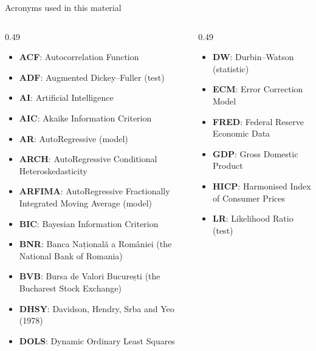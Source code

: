 {
\begin{frame}[noframenumbering]
    \titlepage
\end{frame}
}
\begin{frame}{Acronyms used in this material}
\begin{columns}[T]
\begin{column}{0.49\textwidth}
\begin{itemize}\setlength{\itemsep}{0pt}
    \item \textbf{ACF}: Autocorrelation Function
    \item \textbf{ADF}: Augmented Dickey–Fuller (test)
    \item \textbf{AI}: Artificial Intelligence
    \item \textbf{AIC}: Akaike Information Criterion
    \item \textbf{AR}: AutoRegressive (model)
    \item \textbf{ARCH}: AutoRegressive Conditional Heteroskedasticity
    \item \textbf{ARFIMA}: AutoRegressive Fractionally Integrated Moving Average (model)
    \item \textbf{BIC}: Bayesian Information Criterion
    \item \textbf{BNR}: Banca Națională a României (the National Bank of Romania)
    \item \textbf{BVB}: Bursa de Valori București (the Bucharest Stock Exchange)
    \item \textbf{DHSY}: Davidson, Hendry, Srba and Yeo (1978)
    \item \textbf{DOLS}: Dynamic Ordinary Least Squares
\end{itemize}
\end{column}
\begin{column}{0.49\textwidth}
\begin{itemize}\setlength{\itemsep}{0pt}
    \item \textbf{DW}: Durbin–Watson (statistic)
    \item \textbf{ECM}: Error Correction Model
    \item \textbf{FRED}: Federal Reserve Economic Data
    \item \textbf{GDP}: Gross Domestic Product
    \item \textbf{HICP}: Harmonised Index of Consumer Prices
    \item \textbf{LR}: Likelihood Ratio (test)

\end{itemize}
\end{column}
\end{columns}
\end{frame}
